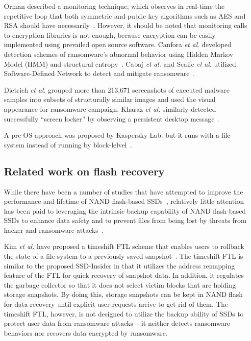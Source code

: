 \documentclass[conference]{IEEEtran}
\newcommand{\etal}{{\it et al.}\xspace}
\newcommand{\ours}{SSD-Insider}
\begin{document}
Orman described a monitoring technique, which observes in real-time
the repetitive loop that both symmetric and public key algorithms 
such as AES and RSA should have necessarily~\cite{orman16}.
However, it should be noted that monitoring calls to encryption libraries is not enough, 
because encryption can be easily implemented using prevailed open source software. 
Canfora \etal developed detection schemes of ransomware's abnormal behavior  
using Hidden Markov Model (HMM) and structural entropy~\cite{cafora16}.
Cabaj \etal and Scaife \etal utilized Software-Defined Network to detect and mitigate 
ransomware~\cite{cabaj16,scaife162}.

Dietrich \etal grouped more than 213,671 screenshots of executed malware samples
into subsets of structurally similar images and used the visual appearance for ransomware 
campaign. Kharaz \etal similarly detected successfully ``screen locker'' by observing 
a persistent desktop message~\cite{kharaz}.



A pre-OS approach was proposed by Kaspersky Lab. but it runs with a file system instead of 
running by block-lelvel~\cite{gusarov14}.



\subsection{Related work on flash recovery}
While there have been a number of studies that have attempted to
improve the performance and lifetime of NAND flash-based
SSDs~\cite{kim2002space, seong2010hydra}, relatively little
attention has been paid to leveraging the intrinsic backup
capability of NAND flash-based SSDs to enhance data safety and to
prevent files from being lost by threats from hacker and ransomware
attacks~\cite{paikposter}.

Kim \textit{et al.} have proposed a timeshift FTL scheme that
enables users to rollback the state of a file system to a
previously saved snapshot~\cite{ltftl}. The timeshift FTL is
similar to the proposed \ours{} in that it utilizes the address
remapping feature of the FTL for quick recovery of snapshot data.
In addition, it regulates the garbage collector so that it does not
select victim blocks that are holding storage snapshots. By doing
this, storage snapshots can be kept in NAND flash for data recovery
until explicit user requests arrive to get rid of them. The
timeshift FTL, however, is not designed to utilize the backup
ability of SSDs to protect user data from ransomware attacks – it
neither detects ransomware behaviors nor recovers data encrypted by
ransomware. 
\end{document}
